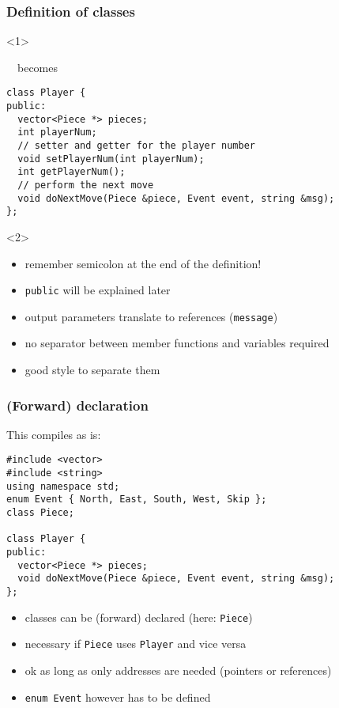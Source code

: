 \documentclass{slides}
\begin{document}
\begin{frame}[fragile]
  \frametitle{Definition of classes}

  \begin{onlyenv}<1> 
    ~~becomes
    \medskip
\end{onlyenv}

\begin{lstlisting}
class Player {
public:
  vector<Piece *> pieces;
  int playerNum;
  // setter and getter for the player number
  void setPlayerNum(int playerNum);
  int getPlayerNum();
  // perform the next move
  void doNextMove(Piece &piece, Event event, string &msg);
};
\end{lstlisting}

\begin{onlyenv}<2>
  \begin{itemize}
  \item \alert{remember semicolon at the end of the definition!}
  \item \lstinline!public! will be explained later
  \item output parameters translate to references (\lstinline!message!)
  \item no separator between member functions and variables required
  \item good style to separate them
  \end{itemize}
\end{onlyenv}
\end{frame}

\begin{frame}[fragile]
  \frametitle{(Forward) declaration}

This compiles as is:
\begin{lstlisting}
#include <vector>
#include <string>
using namespace std;
enum Event { North, East, South, West, Skip };
class Piece;

class Player {
public:
  vector<Piece *> pieces;
  void doNextMove(Piece &piece, Event event, string &msg);
};
\end{lstlisting}

  \begin{itemize}
  \item classes can be (forward) \alert{declared} (here: \lstinline!Piece!)
  \item necessary if \lstinline!Piece! uses \lstinline!Player!
    and vice versa
  \item ok as long as only addresses are needed (pointers or references)
  \item \lstinline!enum Event! however has to be defined
  \end{itemize}
  
\end{frame}
\end{document}
